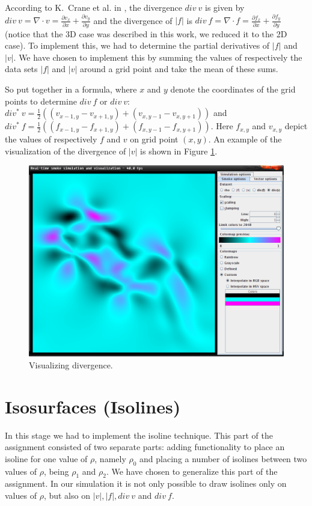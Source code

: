 \documentclass[a4paper,11pt,twoside]{report}
\begin{document}
        According to K.~Crane et al. in \cite{kcilst}, the divergence $div~v$ is given by $div~v = \nabla \cdot v = \frac{\partial v_x}{\partial x} + \frac{\partial v_y}{\partial y}$ and the divergence of $|f|$ is $div~f = \nabla \cdot f = \frac{\partial f_x}{\partial x} + \frac{\partial f_y}{\partial y}$ (notice that the 3D case was described in this work, we reduced it to the 2D case). To implement this, we had to determine the partial derivatives of $|f|$ and $|v|$. We have chosen to implement this by summing the values of respectively the data sets $|f|$ and $|v|$ around a grid point and take the mean of these sums.

        So put together in a formula, where $x$ and $y$ denote the coordinates of the grid points to determine $div~f$ or $div~v$: $div^*~v = \frac{1}{2}((v_{x-1,y} - v_{x+1,y}) + (v_{x,y-1} - v_{x,y+1}))$ and $div^*~f = \frac{1}{2}((f_{x-1,y} - f_{x+1,y}) + (f_{x,y-1} - f_{x,y+1}))$. Here $f_{x,y}$ and $v_{x,y}$ depict the values of respectively $f$ and $v$ on grid point $(x,y)$.   An example of the visualization of the divergence of $|v|$ is shown in Figure \ref{fig:step4}.
		\begin{figure}[h]
		\centering
		\includegraphics[scale=\imagescalefactor]{images/step4.png}
		\caption{Visualizing divergence.}\label{fig:step4}
		\end{figure}
		\clearpage
	\section{Isosurfaces (Isolines)}
        In this stage we had to implement the isoline technique. This part of the assignment consisted of two separate parts: adding functionality to place an isoline for one value of $\rho$, namely $\rho_0$ and placing a number of isolines between two values of $\rho$, being $\rho_1$ and $\rho_2$. We have chosen to generalize this part of the assignment. In our simulation it is not only possible to draw isolines only on values of $\rho$, but also on $|v|, |f|, div~v$ and $div~f$.
\end{document}
